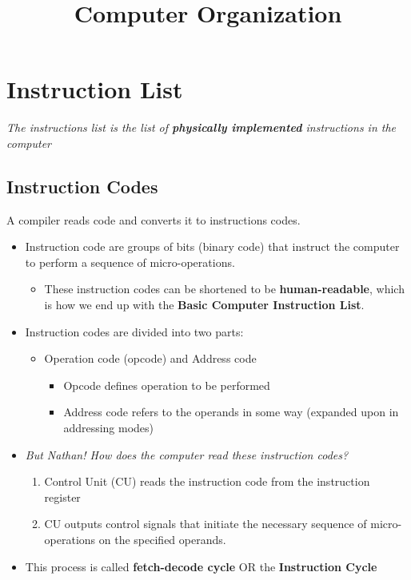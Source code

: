 \documentclass[11pt]{article}
\newenvironment{NumberedList}{%
  \begin{enumerate}[leftmargin=2em, itemsep=0.35em, topsep=0.35em]
}{%
  \end{enumerate}
}
\begin{document}
\title{Computer Organization}

\section{Instruction List}

\textit{The instructions list is the list of \textbf{physically implemented} instructions in the computer}

\subsection{Instruction Codes}

A compiler reads code and converts it to instructions codes. 
\begin{itemize}
  \item Instruction code are groups of bits (binary code) that instruct the computer to perform a sequence of micro-operations.
  \begin{itemize}
    \item These instruction codes can be shortened to be \textbf{human-readable}, which is how we end up with the \textbf{Basic Computer Instruction List}.
  \end{itemize}
  \item Instruction codes are divided into two parts:
  \begin{itemize}
    \item Operation code (opcode) and Address code
    \begin{itemize}
      \item Opcode defines operation to be performed
      \item Address code refers to the operands in some way (expanded upon in addressing modes)
    \end{itemize} 
  \end{itemize}
  \item \textit{But Nathan! How does the computer read these instruction codes?}
  \begin{NumberedList}
  \item Control Unit (CU) reads the instruction code from the instruction register 
  \item CU outputs control signals that initiate the necessary sequence of micro-operations on the specified operands. 
  \end{NumberedList}
  \item This process is called \textbf{fetch-decode cycle} OR the \textbf{Instruction Cycle} 
\end{itemize}
\end{document}
